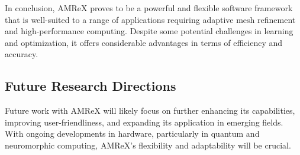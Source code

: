 \documentclass[12pt, a4paper]{scrartcl}
\begin{document}
In conclusion, AMReX proves to be a powerful and flexible software framework that 
is well-suited to a range of applications requiring adaptive mesh refinement and 
high-performance computing. Despite some potential challenges in learning and 
optimization, it offers considerable advantages in terms of efficiency and accuracy.

\subsection{Future Research Directions}

Future work with AMReX will likely focus on further enhancing its capabilities, improving 
user-friendliness, and expanding its application in emerging fields. With ongoing developments 
in hardware, particularly in quantum and neuromorphic computing, AMReX's flexibility and 
adaptability will be crucial.
\end{document}
